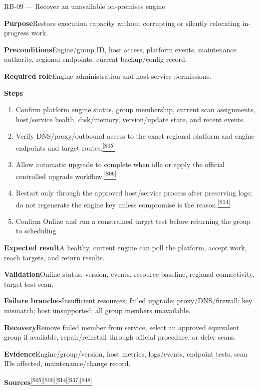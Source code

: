 \documentclass[11pt,letterpaper,oneside]{scrreprt}
\newcommand{\src}[1]{\hyperref[src:#1]{\textsuperscript{\color{R7Orange}[#1]}}}
\newcommand{\field}[1]{\par\smallskip\noindent\textbf{#1}\quad}
\begin{document}
\begin{procedure}{RB-09 --- Recover an unavailable on-premises engine}
\field{Purpose}Restore execution capacity without corrupting or silently relocating in-progress work.
\field{Preconditions}Engine/group ID, host access, platform events, maintenance authority, regional endpoints, current backup/config record.
\field{Required role}Engine administration and host service permissions.
\field{Steps}
\begin{enumerate}
  \item Confirm platform engine status, group membership, current scan assignments, host/service health, disk/memory, version/update state, and recent events.
  \item Verify DNS/proxy/outbound access to the exact regional platform and engine endpoints and target routes.\src{S05}
  \item Allow automatic upgrade to complete when idle or apply the official controlled upgrade workflow.\src{S06}
  \item Restart only through the approved host/service process after preserving logs; do not regenerate the engine key unless compromise is the reason.\src{S14}
  \item Confirm Online and run a constrained target test before returning the group to scheduling.
\end{enumerate}
\field{Expected result}A healthy, current engine can poll the platform, accept work, reach targets, and return results.
\field{Validation}Online status, version, events, resource baseline, regional connectivity, target test scan.
\field{Failure branches}Insufficient resources; failed upgrade; proxy/DNS/firewall; key mismatch; host unsupported; all group members unavailable.
\field{Recovery}Remove failed member from service, select an approved equivalent group if available, repair/reinstall through official procedure, or defer scans.
\field{Evidence}Engine/group/version, host metrics, logs/events, endpoint tests, scan IDs affected, maintenance/change record.
\field{Sources}\src{S05}\src{S06}\src{S14}\src{S37}\src{S48}
\end{procedure}
\end{document}
